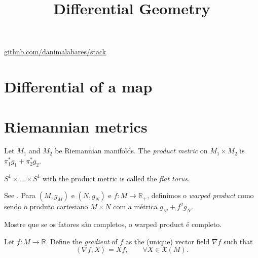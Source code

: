 



\title{Differential Geometry}
\maketitle

\label{section-phantom}
\hfill
\href{http://github.com/danimalabares/stack}{github.com/danimalabares/stack}
\tableofcontents

\section{Differential of a map}
\label{section-differential}

\section{Riemannian metrics}
\label{section-Riemannian-metrics}

\begin{definition}
\label{definition-product-metric}
Let $M_1$ and $M_2$ be Riemannian manifolds. The {\it product metric} on
$M_1\times M_2$ is $\pi_1^*g_1+\pi_2^*g_2$.
\end{definition}

\begin{definition}
\label{definition-flat-torus}
$S^1\times\ldots\times S^1$ with the product metric is called the {\it flat
torus}.
\end{definition}

\begin{exercise}
\label{exercise-wraped-product}
See \cite{pet}. Para $(M,g_M)$ e $(N,g_N)$ e $f:M \to \mathbb{R}_+$, definimos o
 {\it warped product} como sendo o produto cartesiano $M\times N$ com a métrica 
 $g_M+f^2g_N$.

Mostre que se os fatores são completos, o warped product é completo.
\end{exercise}

\begin{definition}
\label{definition-gradient}
Let  $f:M\to\mathbb{R}$. Define the {\it gradient} of $f$ as the (unique) vector
field $\nabla f$ such that
\begin{equation}
\label{equation-gradient}
\left<\nabla f,X\right>=Xf, \qquad \forall X\in\mathfrak{X}(M).
\end{equation}
\end{definition}

